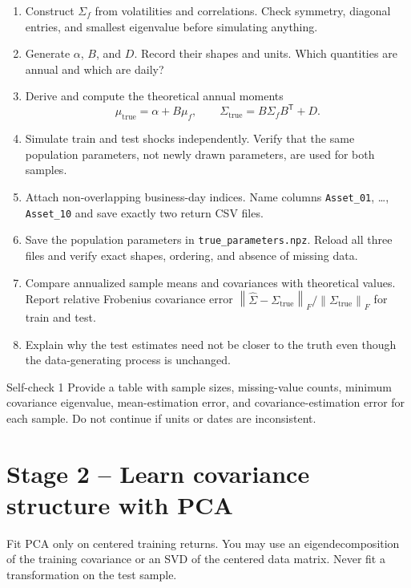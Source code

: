 \documentclass[10pt]{article}
\newcommand{\trans}{^{\mathsf T}}
\newcommand{\norm}[1]{\left\lVert#1\right\rVert}
\begin{document}
\begin{enumerate}[label=\textbf{1.\arabic*.}]
\item Construct $\Sigma_f$ from volatilities and correlations. Check symmetry,
diagonal entries, and smallest eigenvalue before simulating anything.
\item Generate $\alpha$, $B$, and $D$. Record their shapes and units. Which
quantities are annual and which are daily?
\item Derive and compute the theoretical annual moments
\[
\mu_{\mathrm{true}}=\alpha+B\mu_f,
\qquad
\Sigma_{\mathrm{true}}=B\Sigma_fB\trans+D.
\]
\item Simulate train and test shocks independently. Verify that the same
population parameters, not newly drawn parameters, are used for both samples.
\item Attach non-overlapping business-day indices. Name columns
\texttt{Asset\_01}, \ldots, \texttt{Asset\_10} and save exactly two return
CSV files.
\item Save the population parameters in \texttt{true\_parameters.npz}. Reload
all three files and verify exact shapes, ordering, and absence of missing data.
\item Compare annualized sample means and covariances with theoretical values.
Report relative Frobenius covariance error
$\norm{\widehat\Sigma-\Sigma_{\mathrm{true}}}_F/
\norm{\Sigma_{\mathrm{true}}}_F$ for train and test.
\item Explain why the test estimates need not be closer to the truth even
though the data-generating process is unchanged.
\end{enumerate}

\begin{checkpointbox}{Self-check 1}
Provide a table with sample sizes, missing-value counts, minimum covariance
eigenvalue, mean-estimation error, and covariance-estimation error for each
sample. Do not continue if units or dates are inconsistent.
\end{checkpointbox}

\section{Stage 2 -- Learn covariance structure with PCA}

Fit PCA only on centered training returns. You may use an eigendecomposition
of the training covariance or an SVD of the centered data matrix. Never fit a
transformation on the test sample.
\end{document}
